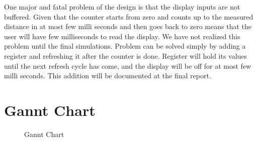 \documentclass[12pt, a4paper]{article}
\begin{document}
        \bigskip
        One major and fatal problem of the design is that the display inputs are not buffered. Given that the counter starts from zero and counts up to the measured distance in at most few milli seconds and then goes back to zero means that the user will have few milliseconds to read the display. We have not realized this problem until the final simulations. Problem can be solved simply by adding a register and refreshing it after the counter is done. Register will hold its values until the next refresh cycle has come, and the display will be off for at most few milli seconds. This addition will be documented at the final report. 

     
    \pagebreak
    \section{Gannt Chart}

        \begin{figure}[H]\centering
                \caption{Gannt Chart}
        \end{figure}
\end{document}
